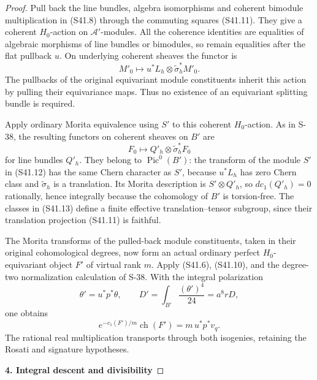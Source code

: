 \documentclass[11pt,a4paper]{article}
\theoremstyle{definition}
\begin{document}
\begin{proof}
Pull back the line bundles, algebra isomorphisms and coherent bimodule multiplication in (S41.8) through the commuting squares (S41.11). They give a coherent \(H_0\)-action on \(\mathscr A'\)-modules. All the coherence identities are equalities of algebraic morphisms of line bundles or bimodules, so remain equalities after the flat pullback \(u\). On underlying coherent sheaves the functor is \[
 M'_0\longmapsto u^*L_h\otimes\widetilde\sigma_h^*M'_0.
 \tag{S41.12}
\] The pullbacks of the original equivariant module constituents inherit this action by pulling their equivariance maps. Thus no existence of an equivariant splitting bundle is required.

Apply ordinary Morita equivalence using \(S'\) to this coherent \(H_0\)-action. As in S-38, the resulting functors on coherent sheaves on \(B'\) are \[
 F_0\longmapsto Q'_h\otimes\widetilde\sigma_h^*F_0
 \tag{S41.13}
\] for line bundles \(Q'_h\). They belong to \(\operatorname{Pic}^0(B')\): the transform of the module \(S'\) in (S41.12) has the same Chern character as \(S'\), because \(u^*L_h\) has zero Chern class and \(\widetilde\sigma_h\) is a translation. Its Morita description is \(S'\otimes Q'_h\), so \(d c_1(Q'_h)=0\) rationally, hence integrally because the cohomology of \(B'\) is torsion-free. The classes in (S41.13) define a finite effective translation--tensor subgroup, since their translation projection (S41.11) is faithful.

The Morita transforms of the pulled-back module constituents, taken in their original cohomological degrees, now form an actual ordinary perfect \(H_0\)-equivariant object \(F'\) of virtual rank \(m\). Apply (S41.6), (S41.10), and the degree-two normalization calculation of S-38. With the integral polarization \[
 \theta'=u^*p^*\theta,\qquad
 D'=\int_{B'}\frac{(\theta')^4}{24}=a^8rD,
\] one obtains \[
 e^{-c_1(F')/m}\operatorname{ch}(F')=m\,u^*p^*v_q.
 \tag{S41.14}
\] The rational real multiplication transports through both isogenies, retaining the Rosati and signature hypotheses.

\par

\medskip\noindent\textbf{4. Integral descent and divisibility}\quad


\end{proof}
\end{document}
